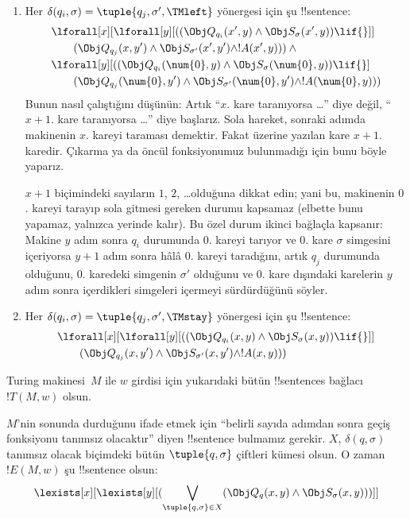 \begin{enumerate}
\begin{enumerate}
\item {} Her
$\delta(q_i,\sigma)=\tuple{q_j,\sigma',\TMleft}$ yönergesi için şu
!!{sentence}:
\begin{align*}
& \lforall[x][\lforall[y][
    ((\Obj Q_{q_i}(x', y) \land \Obj S_{\sigma}(x', y)) \lif {}]]\\
& \qquad   (\Obj Q_{q_j}(x, y') \land \Obj S_{\sigma'}(x', y') \land
!A(x', y))) \land {}\\
& \lforall[y][((\Obj Q_{q_i}(\num{0}, y) \land \Obj S_{\sigma}(\num{0},
    y)) \lif {}]\\
& \qquad (\Obj Q_{q_j}(\num{0}, y') \land \Obj S_{\sigma'}(\num{0},
  y') \land !A(\num{0}, y)))
\end{align*}
Bunun nasıl çalıştığını düşünün: Artık ``$x$. kare taranıyorsa \dots'' diye
değil, ``$x+1$. kare taranıyorsa \dots'' diye başlarız. Sola hareket, sonraki
adımda makinenin $x$. kareyi taraması demektir. Fakat üzerine yazılan kare
$x+1$. karedir. Çıkarma ya da öncül fonksiyonumuz bulunmadığı için bunu böyle
yaparız.

$x+1$ biçimindeki sayıların $1$, $2$, \dots olduğuna dikkat edin; yani bu,
makinenin $0$. kareyi tarayıp sola gitmesi gereken durumu kapsamaz (elbette
bunu yapamaz, yalnızca yerinde kalır). Bu özel durum ikinci bağlaçla kapsanır:
Makine $y$ adım sonra $q_i$ durumunda $0$. kareyi tarıyor ve $0$. kare
$\sigma$ simgesini içeriyorsa $y+1$ adım sonra hâlâ $0$. kareyi taradığını,
artık $q_j$ durumunda olduğunu, $0$. karedeki simgenin $\sigma'$ olduğunu ve
$0$. kare dışındaki karelerin $y$ adım sonra içerdikleri simgeleri içermeyi
sürdürdüğünü söyler.
\item {} Her
$\delta(q_i,\sigma)=\tuple{q_j,\sigma',\TMstay}$ yönergesi için şu
!!{sentence}:
\begin{align*}
& \lforall[x][\lforall[y][(
   (\Obj Q_{q_i}(x, y) \land \Obj S_{\sigma}(x, y)) \lif {}]] \\
&\qquad   (\Obj Q_{q_j}(x, y') \land \Obj S_{\sigma'}(x, y') \land
!A(x, y)))
\end{align*}
\end{enumerate}
\end{enumerate}
Turing makinesi~$M$ ile $w$ girdisi için yukarıdaki bütün !!{sentence}s
bağlacı $!T(M,w)$ olsun.

$M$'nin sonunda durduğunu ifade etmek için ``belirli sayıda adımdan sonra
geçiş fonksiyonu tanımsız olacaktır'' diyen !!{sentence} bulmamız gerekir.
$X$, $\delta(q,\sigma)$ tanımsız olacak biçimdeki bütün
$\tuple{q,\sigma}$ çiftleri kümesi olsun. O zaman $!E(M,w)$ şu !!{sentence}
olsun:
\[
\lexists[x][\lexists[y][(\bigvee_{\tuple{q, \sigma} \in
      X}(\Obj Q_q(x, y) \land \Obj S_\sigma(x, y)))]]
\]

